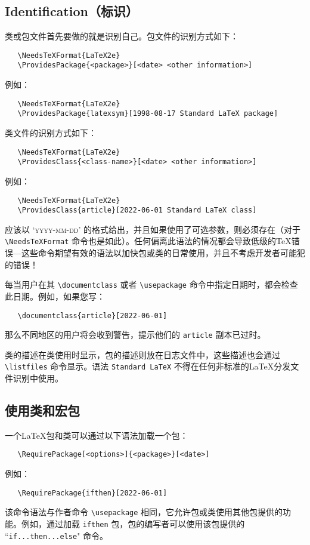 \documentclass[12pt]{ltxguide}
\begin{document}
\subsection{Identification（标识）}
类或包文件首先要做的就是识别自己。包文件的识别方式如下：
\begin{verbatim}
   \NeedsTeXFormat{LaTeX2e}
   \ProvidesPackage{<package>}[<date> <other information>]
\end{verbatim}
例如：
\begin{verbatim}
   \NeedsTeXFormat{LaTeX2e}
   \ProvidesPackage{latexsym}[1998-08-17 Standard LaTeX package]
\end{verbatim}
类文件的识别方式如下：
\begin{verbatim}
   \NeedsTeXFormat{LaTeX2e}
   \ProvidesClass{<class-name>}[<date> <other information>]
\end{verbatim}
例如：
\begin{verbatim}
   \NeedsTeXFormat{LaTeX2e}
   \ProvidesClass{article}[2022-06-01 Standard LaTeX class]
\end{verbatim}
 应该以 `\textsc{yyyy-mm-dd}' 的格式给出，并且如果使用了可选参数，则必须存在（对于 \verb|\NeedsTeXFormat| 命令也是如此）。任何偏离此语法的情况都会导致低级的\TeX{}错误---这些命令期望有效的语法以加快包或类的日常使用，并且不考虑开发者可能犯的错误！

每当用户在其 \verb|\documentclass| 或者 \verb|\usepackage| 命令中指定日期时，都会检查此日期。例如，如果您写：
\begin{verbatim}
   \documentclass{article}[2022-06-01]
\end{verbatim}
那么不同地区的用户将会收到警告，提示他们的 \verb|article| 副本已过时。

类的描述在类使用时显示，包的描述则放在日志文件中，这些描述也会通过 \verb|\listfiles| 命令显示。语法 \texttt{Standard LaTeX} 不得在任何非标准的\LaTeX{}分发文件识别中使用。
%
\subsection{使用类和宏包}
一个\LaTeX{}包和类可以通过以下语法加载一个包：
\begin{verbatim}
   \RequirePackage[<options>]{<package>}[<date>]
\end{verbatim}
例如：
\begin{verbatim}
   \RequirePackage{ifthen}[2022-06-01]
\end{verbatim}
该命令语法与作者命令 \verb|\usepackage| 相同，它允许包或类使用其他包提供的功能。例如，通过加载 \verb|ifthen| 包，包的编写者可以使用该包提供的 ``\verb|if...then...else|" 命令。
\end{document}
